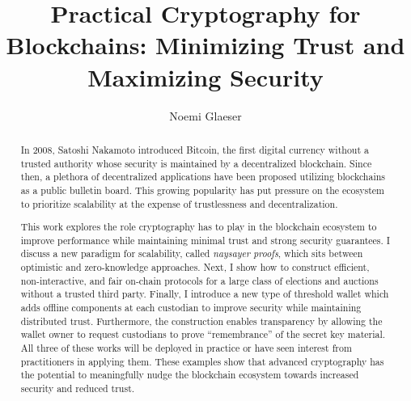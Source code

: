 \documentclass{article}
\title{Practical Cryptography for Blockchains: Minimizing Trust and Maximizing Security}
\author{Noemi Glaeser}
\date{}
\newcommand{\noemi}[1]{\textcolor{magenta}{Noemi: #1}}
\begin{document}
\maketitle
\begin{abstract}
In 2008, Satoshi Nakamoto introduced Bitcoin, the first digital currency without a trusted authority whose security is maintained by a decentralized blockchain. Since then, a plethora of decentralized applications have been proposed utilizing blockchains as a public bulletin board. This growing popularity has put pressure on the ecosystem to prioritize scalability at the expense of trustlessness and decentralization.

This work explores the role cryptography has to play in the blockchain ecosystem to improve performance while maintaining minimal trust and strong security guarantees. 
I discuss a new paradigm for scalability, called \emph{naysayer proofs}, which sits between optimistic and zero-knowledge approaches.
Next, I show how to construct efficient, non-interactive, and fair on-chain protocols for a large class of elections and auctions without a trusted third party. 
Finally, I introduce a new type of threshold wallet which adds offline components at each custodian to improve security while maintaining distributed trust. Furthermore, the construction enables transparency by allowing the wallet owner to request custodians to prove ``remembrance'' of the secret key material.
All three of these works will be deployed in practice or have seen interest from practitioners in applying them. These examples show that advanced cryptography has the potential to meaningfully nudge the blockchain ecosystem towards increased security and reduced trust.

\end{abstract}
\end{document}
